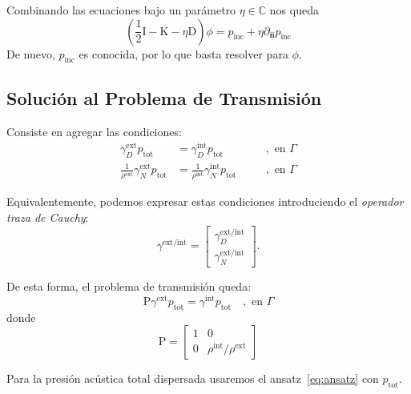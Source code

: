 \documentclass[11pt]{article}
\numberwithin{equation}{section}
\def\C{\mathbb{C}}
\def\n{\hat{\textbf{n}}}
\def\Dlop{\mathrm{K}}
\def\Hop{\mathrm{D}}
\def\Idop{\textrm{I}}
\def\traceN{\gamma_{N}}
\def\traceD{\gamma_{D}}
\def\tot{\textrm{tot}}
\def\exterior{\textrm{ext}}
\def\interior{\textrm{int}}
\def\inc{\textrm{inc}}
\def\Rho{\mathrm{P}}
\begin{document}
\noindent Combinando las ecuaciones bajo un parámetro \(\eta \in \C\) nos queda
\begin{equation}
	\left(\frac{1}{2} \Idop - \Dlop - \eta \Hop \right) \phi
	=
	p_{\inc} + \eta \partial_{\n} p_{\inc}
\end{equation}
De nuevo, \(p_{\inc}\) es conocida, por lo que basta resolver para \(\phi\). 

\subsection{Solución al Problema de Transmisión}
\label{ssec:bem:transmission}

Consiste en agregar las condiciones:
\begin{subequations}\label{bem:tp}
	\begin{alignat}{2}
		\gamma^{\exterior}_{D} p_{\tot}
		&= 
		\gamma^{\interior}_{D} p_{\tot} 
		&\quad&, \textrm{ en } \Gamma
		\\
		\frac{1}{\rho^{\exterior}}
		\gamma^{\exterior}_{N} p_{\tot}
		&= 
		\frac{1}{\rho^{\interior}}
		\gamma^{\interior}_{N} p_{\tot} 
		&\quad&, \textrm{ en } \Gamma
	\end{alignat}
\end{subequations}

Equivalentemente, podemos expresar estas condiciones introduciendo el
\textit{operador traza de Cauchy}:
\begin{equation} \label{op:trace:cauchy}
	\gamma^{\exterior/\interior}
	=
	\begin{bmatrix}
		\traceD^{\exterior/\interior} \\[5pt]
		\traceN^{\exterior/\interior}
	\end{bmatrix}.
\end{equation}

De esta forma, el problema de transmisión queda:
\begin{equation}
	\Rho
	\gamma^{\exterior} p_{\tot} 
	=
	\gamma^{\interior} p_{\tot}
	\quad, \textrm{ en } \Gamma
\end{equation}
donde 
\begin{equation}
	\Rho
	= 
	\begin{bmatrix}
		1 & 0\\
		0 & \rho^{\interior}/\rho^{\exterior}	
	\end{bmatrix}
\end{equation}

Para la presión acústica total dispersada usaremos el ansatz~\eqref{eq:ansatz}
con \(p_{\tot}\). 
\end{document}
